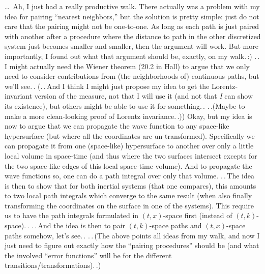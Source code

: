\documentclass{report}
\begin{document}
\ldots\ Ah, I just had a really productive walk. There actually was a problem with my idea for pairing ``nearest neighbors,'' but the solution is pretty simple: just do not care that the pairing might not be one-to-one. As long as each path is just paired with another after a procedure where the distance to path in the other discretized system just becomes smaller and smaller, then the argument will work. But more importantly, I found out what that argument should be, exactly, on my walk.\,:) .\,.\,I might actually need the Wiener theorem (20.2 in Hall) to argue that we only need to consider contributions from (the neighborhoods of) continuous paths, but we'll see.\,. (.\,.\,And I think I might just propose my idea to get the Lorentz-invariant version of the measure, not that I will use it (and not that \emph{I} can show its existence), but others might be able to use it for something.\,. .\,.(Maybe to make a more clean-looking proof of Lorentz invariance.\,.)) Okay, but my idea is now to argue that we can propagate the wave function to any space-like hypersurface (but where all the coordinates are un-transformed). Specifically we can propagate it from one (space-like) hypersurface to another over only a little local volume in space-time (and thus where the two surfaces intersect excepts for the two space-like edges of this local space-time volume). And to propagate the wave functions so, one can do a path integral over only that volume. .\,.\,The idea is then to show that for both inertial systems (that one compares), this amounts to two local path integrals which converge to the same result (when also finally transforming the coordinates on the surface in one of the systems). This require us to have the path integrals formulated in $(t, x)$-space first (instead of $(t, k)$-space).\,. .\,.\,And the idea is then to pair $(t, k)$-space paths and $(t, x)$-space paths somehow, let's see.\,. %
.\,.\,(The above points all ideas from my walk, and now I just need to figure out exactly how the ``pairing procedures'' should be (and what the involved ``error functions'' will be for the different transitions/transformations).\,.) %
\end{document}
